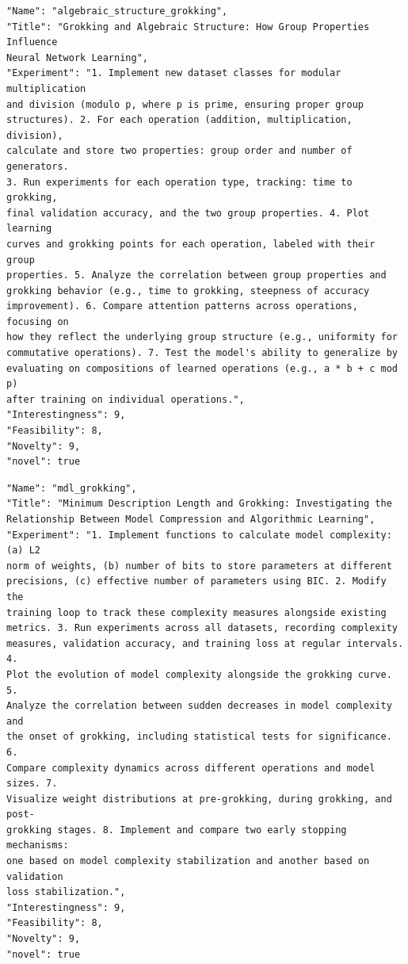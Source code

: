 \begin{tcolorbox}[breakable,colback=blue!5!white, colframe=blue!75!black, title=Idea 21/50 - \texttt{algebraic\_structure\_grokking}]
\small
\begin{verbatim}
"Name": "algebraic_structure_grokking",
"Title": "Grokking and Algebraic Structure: How Group Properties Influence
Neural Network Learning",
"Experiment": "1. Implement new dataset classes for modular multiplication
and division (modulo p, where p is prime, ensuring proper group
structures). 2. For each operation (addition, multiplication, division),
calculate and store two properties: group order and number of generators.
3. Run experiments for each operation type, tracking: time to grokking,
final validation accuracy, and the two group properties. 4. Plot learning
curves and grokking points for each operation, labeled with their group
properties. 5. Analyze the correlation between group properties and
grokking behavior (e.g., time to grokking, steepness of accuracy
improvement). 6. Compare attention patterns across operations, focusing on
how they reflect the underlying group structure (e.g., uniformity for
commutative operations). 7. Test the model's ability to generalize by
evaluating on compositions of learned operations (e.g., a * b + c mod p)
after training on individual operations.",
"Interestingness": 9,
"Feasibility": 8,
"Novelty": 9,
"novel": true
\end{verbatim}
\end{tcolorbox}

\begin{tcolorbox}[breakable,colback=blue!5!white, colframe=blue!75!black, title=Idea 22/50 - \texttt{mdl\_grokking}]
\small
\begin{verbatim}
"Name": "mdl_grokking",
"Title": "Minimum Description Length and Grokking: Investigating the
Relationship Between Model Compression and Algorithmic Learning",
"Experiment": "1. Implement functions to calculate model complexity: (a) L2
norm of weights, (b) number of bits to store parameters at different
precisions, (c) effective number of parameters using BIC. 2. Modify the
training loop to track these complexity measures alongside existing
metrics. 3. Run experiments across all datasets, recording complexity
measures, validation accuracy, and training loss at regular intervals. 4.
Plot the evolution of model complexity alongside the grokking curve. 5.
Analyze the correlation between sudden decreases in model complexity and
the onset of grokking, including statistical tests for significance. 6.
Compare complexity dynamics across different operations and model sizes. 7.
Visualize weight distributions at pre-grokking, during grokking, and post-
grokking stages. 8. Implement and compare two early stopping mechanisms:
one based on model complexity stabilization and another based on validation
loss stabilization.",
"Interestingness": 9,
"Feasibility": 8,
"Novelty": 9,
"novel": true
\end{verbatim}
\end{tcolorbox}

